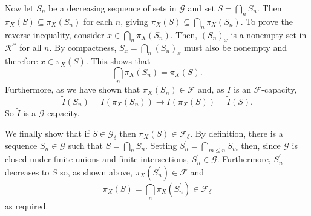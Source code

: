 \documentclass[12pt]{article}
\begin{document}
Now let $S_n$ be a decreasing sequence of sets in $\mathcal{G}$ and set $S=\bigcap_nS_n$. Then $\pi_X(S)\subseteq\pi_X(S_n)$ for each $n$, giving $\pi_X(S)\subseteq\bigcap_n\pi_X(S_n)$. To prove the reverse inequality, consider $x\in\bigcap_n\pi_X(S_n)$. Then, $(S_n)_x$ is a nonempty set in $\mathcal{K}^*$ for all $n$. By compactness, $S_x=\bigcap_n(S_n)_x$ must also be nonempty and therefore $x\in \pi_X(S)$. This shows that
\begin{equation*}
\bigcap_n\pi_X(S_n)=\pi_X(S).
\end{equation*}
Furthermore, as we have shown that $\pi_X(S_n)\in\mathcal{F}$ and, as $I$ is an $\mathcal{F}$-capacity,
\begin{equation*}
\tilde I(S_n)=I(\pi_X(S_n))\rightarrow I(\pi_X(S))=\tilde I(S).
\end{equation*}
So $\tilde I$ is a $\mathcal{G}$-capacity.

We finally show that if $S\in\mathcal{G}_\delta$ then $\pi_X(S)\in \mathcal{F}_\delta$. By definition, there is a sequence $S_n\in\mathcal{G}$ such that $S=\bigcap_nS_n$. Setting $S^\prime_n=\bigcap_{m\le n}S_m$ then, since $\mathcal{G}$ is closed under finite unions and finite intersections, $S^\prime_n\in\mathcal{G}$. Furthermore, $S^\prime_n$ decreases to $S$ so, as shown above, $\pi_X(S^\prime_n)\in\mathcal{F}$ and
\begin{equation*}
\pi_X(S)=\bigcap_n\pi_X(S^\prime_n)\in\mathcal{F}_\delta
\end{equation*}
as required.

\end{document}
